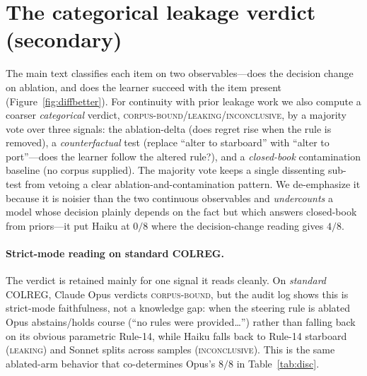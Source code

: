 \documentclass{article}
\begin{document}
\appendix

\section{The categorical leakage verdict (secondary)}
\label{app:verdict}
The main text classifies each item on two observables---does the decision change on ablation, and does
the learner succeed with the item present (Figure~\ref{fig:diffbetter}). For continuity with prior
leakage work we also compute a coarser \emph{categorical} verdict,
\textsc{corpus-bound}/\textsc{leaking}/\textsc{inconclusive}, by a majority vote over three signals:
the ablation-delta (does regret rise when the rule is removed), a \emph{counterfactual} test (replace
``alter to starboard'' with ``alter to port''---does the learner follow the altered rule?), and a
\emph{closed-book} contamination baseline (no corpus supplied). The majority vote keeps a single
dissenting sub-test from vetoing a clear ablation-and-contamination pattern. We de-emphasize it because
it is noisier than the two continuous observables and \emph{undercounts} a model whose decision plainly
depends on the fact but which answers closed-book from priors---it put Haiku at $0/8$ where the
decision-change reading gives $4/8$.

\paragraph{Strict-mode reading on standard COLREG.} The verdict is retained mainly for one signal it
reads cleanly. On \emph{standard} COLREG, Claude Opus verdicts \textsc{corpus-bound}, but the audit log
shows this is strict-mode faithfulness, not a knowledge gap: when the steering rule is ablated Opus
abstains/holds course (``no rules were provided\ldots'') rather than falling back on its obvious
parametric Rule-14, while Haiku falls back to Rule-14 starboard (\textsc{leaking}) and Sonnet splits
across samples (\textsc{inconclusive}). This is the same ablated-arm behavior that co-determines Opus's
$8/8$ in Table~\ref{tab:disc}.
\end{document}
